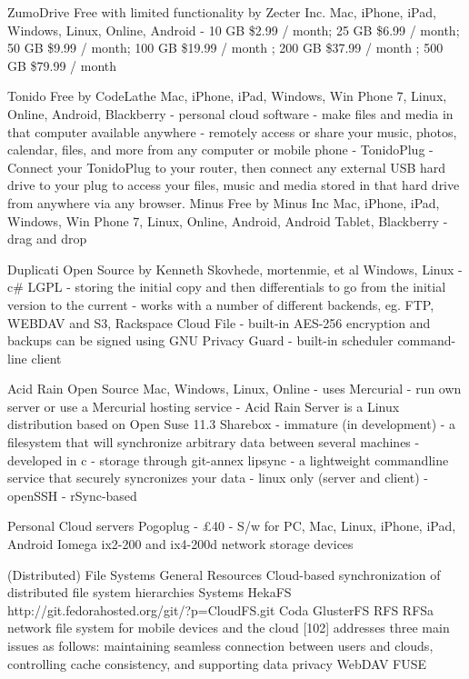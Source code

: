 			ZumoDrive
				Free with limited functionality by Zecter Inc.
				Mac, iPhone, iPad, Windows, Linux, Online, Android
				- 10 GB \$2.99 / month; 25 GB \$6.99 / month; 50 GB \$9.99 / month; 100 GB \$19.99 / month ; 200 GB \$37.99 / month ; 500 GB 	\$79.99 / month
				
			Tonido
				Free by CodeLathe 
				Mac, iPhone, iPad, Windows, Win Phone 7, Linux, Online, Android, Blackberry
				- personal cloud software
				- make files and media in that computer available anywhere 
				- remotely access or share your music, photos, calendar, files, and more from any computer or mobile phone
				- TonidoPlug
					- Connect your TonidoPlug to your router, then connect any external USB hard drive to your plug to access your files, music and media stored in that hard drive from anywhere via any browser.
			Minus
				Free by Minus Inc 
				Mac, iPhone, iPad, Windows, Win Phone 7, Linux, Online, Android, Android Tablet, Blackberry  
				- drag and drop
				
			Duplicati
				Open Source by Kenneth Skovhede, mortenmie, et al 
				Windows, Linux 
				- c\#
				LGPL
				- storing the initial copy and then differentials to go from the initial version to the current
				- works with a number of different backends, eg. FTP, WEBDAV and S3, Rackspace Cloud File
				- built-in AES-256 encryption and backups can be signed using GNU Privacy Guard
				- built-in scheduler
				command-line client
				
			Acid Rain
				Open Source
				Mac, Windows, Linux, Online 
				- uses Mercurial 
					- run own server or use a Mercurial hosting service
				- Acid Rain Server is a Linux distribution based on Open Suse 11.3
			Sharebox
				- immature (in development)
				- a filesystem that will synchronize arbitrary data between several machines
				- developed in c
				- storage through git-annex
			lipsync
				- a lightweight commandline service that securely syncronizes your data 
				- linux only (server and client)
				- openSSH
				- rSync-based
				
		Personal Cloud servers		
			Pogoplug
				- £40
				- S/w for PC, Mac, Linux, iPhone, iPad, Android
			Iomega
				ix2-200 and ix4-200d network storage devices

	(Distributed) File Systems
		General Resources
			Cloud-based synchronization of distributed file system hierarchies
		Systems
			HekaFS
			http://git.fedorahosted.org/git/?p=CloudFS.git 
			Coda
			GlusterFS
			RFS
				RFSa network file system for mobile devices and the cloud [102]
				addresses three main issues as follows: maintaining seamless connection between users and clouds, controlling cache consistency, and supporting data privacy
		WebDAV 
		FUSE		

